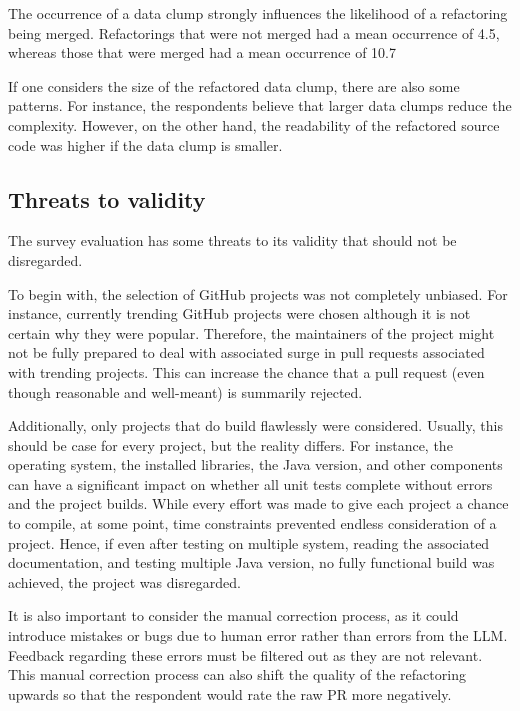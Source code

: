 The occurrence of a data clump strongly influences the likelihood of a refactoring being merged. Refactorings that were not merged had a mean occurrence of 4.5, whereas those that were merged had a mean occurrence of 10.7

If one considers the size of the refactored data clump, there are also some patterns. For instance, the respondents believe that larger data clumps reduce the complexity. However, on the other hand, the readability of the refactored source code was higher if the data clump is smaller.

\subsection{Threats to validity}

The survey evaluation has some threats to its validity that should not be disregarded.

To begin with, the selection of GitHub projects was not completely unbiased. For instance, currently trending GitHub projects were chosen although it is not certain why they were popular. Therefore, the maintainers of the project might not be fully prepared to deal with associated surge in pull requests associated with trending projects. This can increase the chance that a pull request (even though reasonable and well-meant) is summarily rejected. \cite{10.1145/3366423.3380272}

Additionally, only projects that do build flawlessly were considered. Usually, this should be case for every project, but the reality differs. For instance, the operating system, the installed libraries, the Java version, and other components can have a significant impact on whether all unit tests complete without errors and the project builds.  While every effort was made to give each project a chance to compile, at some point, time constraints prevented endless consideration of a project. Hence, if even after testing on multiple system, reading the associated documentation, and testing multiple Java version, no fully functional build was achieved, the project was disregarded.

It is also important to consider the manual correction process, as it could introduce mistakes or bugs due to human error rather than errors from the \ac{LLM}. Feedback regarding these errors must be filtered out as they are not relevant. This manual correction process can also shift the quality of the refactoring upwards so that the respondent would rate the raw \ac{PR} more negatively. 


